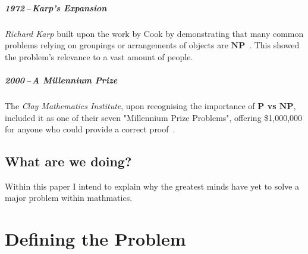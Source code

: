 \documentclass[12pt]{report}
\begin{document}
\paragraph{1972\,--\,Karp's Expansion}
\textit{Richard Karp} built upon the work by Cook by demonstrating that many common problems relying on groupings or arrangements of objects are $\mathbf{NP}$~\cite{karp1972}.
This showed the problem's relevance to a vast amount of people.

\paragraph{2000\,--\,A Millennium Prize}
The \textit{Clay Mathematics Institute}, upon recognising the importance of \textbf{$\mathbf{P}$ vs $\mathbf{NP}$}, included it as one of their seven "Millennium Prize Problems", offering \$1,000,000 for anyone who could provide a correct proof~\cite{claymillennium}.

\section*{What are we doing?}
Within this paper I intend to explain why the greatest minds have yet to solve a major problem within mathmatics.


\newpage
\chapter{Defining the Problem}
\end{document}
